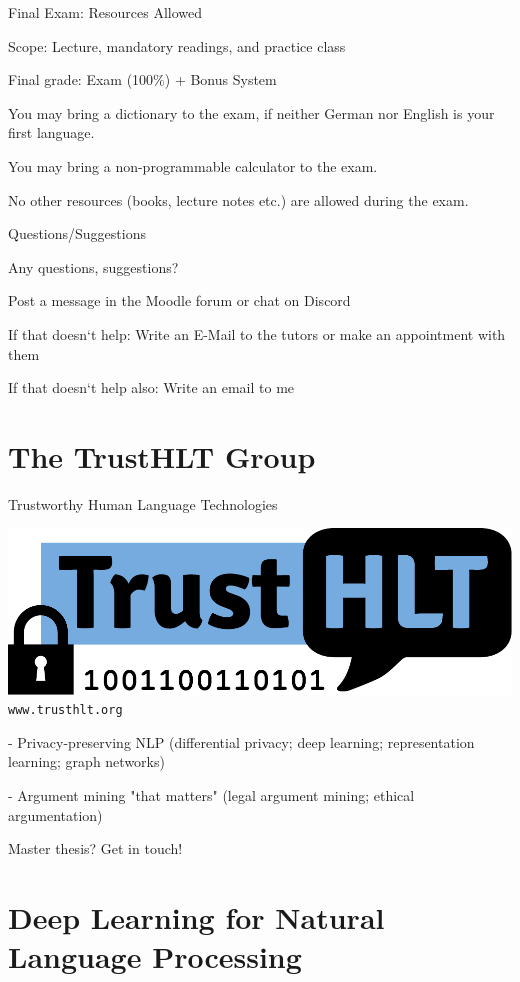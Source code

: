 \documentclass[12pt]{beamer}
\begin{document}
\begin{frame}{Final Exam: Resources Allowed}

Scope: Lecture, mandatory readings, and practice class

Final grade: Exam (100\%) + Bonus System

You may bring a dictionary to the exam, if neither German nor English is your first language.

You may bring a non-programmable calculator to the exam.

No other resources (books, lecture notes etc.) are allowed during the exam.
	
\end{frame}

\begin{frame}{Questions/Suggestions}

Any questions, suggestions?

Post a message in the Moodle forum or chat on Discord

If that doesn‘t help: Write an E-Mail to the tutors or make an appointment with them

If that doesn‘t help also: Write an email to me	
\end{frame}


\section{The TrustHLT Group}

\begin{frame}{Trustworthy Human Language Technologies}

\includegraphics[height=.8cm]{img/logo-trusthlt.pdf} \hfill \texttt{www.trusthlt.org}

\bigskip

- Privacy-preserving NLP (differential privacy; deep learning; representation learning; graph networks)

- Argument mining "that matters" (legal argument mining; ethical argumentation)

\bigskip

Master thesis? Get in touch!
	
\end{frame}


\section{Deep Learning for Natural Language Processing}
\end{document}
